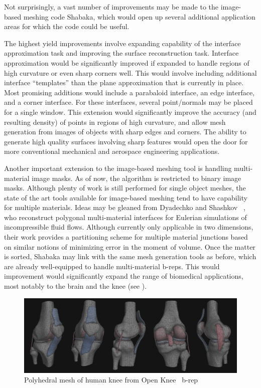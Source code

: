 Not surprisingly, a vast number of improvements may be made to the image-based meshing code Shabaka, which would open up several additional application areas for which the code could be useful.

The highest yield improvements involve expanding capability of the interface approximation task and improving the surface reconstruction task. Interface approximation would be significantly improved if expanded to handle regions of high curvature or even sharp corners well. This would involve including additional interface ``templates'' than the plane approximation that is currently in place. Most promising additions would include a parabaloid interface, an edge interface, and a corner interface. For these interfaces, several point/normals may be placed for a single window. This extension would significantly improve the accuracy (and resulting density) of points in regions of high curvature, and allow mesh generation from images of objects with sharp edges and corners. The ability to generate high quality surfaces involving sharp features would open the door for more conventional mechanical and aerospace engineering applications.

Another important extension to the image-based meshing tool is handling multi-material image masks. As of now, the algorithm is restricted to binary image masks. Although plenty of work is still performed for single object meshes, the state of the art tools available for image-based meshing tend to have capability for multiple materials. Ideas may be gleaned from Dyadechko and Shashkov ~\cite{dyadechko_2008}, who reconstruct polygonal multi-material interfaces for Eulerian simulations of incompressible fluid flows. Although currently only applicable in two dimensions, their work provides a partitioning scheme for multiple material junctions based on similar notions of minimizing error in the moment of volume. Once the matter is sorted, Shabaka may link with the same mesh generation tools as before, which are already well-equipped to handle multi-material b-reps. This would improvement would significantly expand the range of biomedical applications, most notably to the brain and the knee (see ).

\begin{figure}
\centering
		\includegraphics[width=1.0\textwidth]{media/7-polyknee/fullmesh.png}
%
\caption{Polyhedral mesh of human knee from Open Knee~\cite{erdemir_2015} b-rep}
\label{fig:polyknee}
\end{figure}

